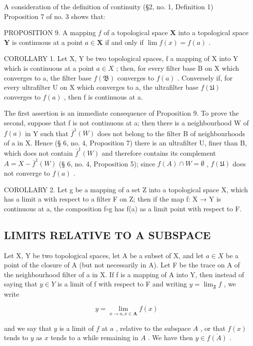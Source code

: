 A consideration of the definition of continuity (§2, no. 1, Definition 1) Proposition 7 of no. 3 shows that:

PROPOSITION 9. A mapping \(f\) of a topological space \(\mathbf{X}\) into a topological space \(\mathbf{Y}\) is continuous at a point \(a \in \mathbf{X}\) if and only if \(\lim f(x) = f(a)\) .

COROLLARY 1. Let X, Y be two topological spaces, f a mapping of X into Y which is continuous at a point \(a \in X\) ; then, for every filter base B on X which converges to a, the filter base \(f(\mathfrak{B})\) converges to \(f(a)\) . Conversely if, for every ultrafilter U on X which converges to a, the ultrafilter base \(f(\mathfrak{U})\) converges to \(f(a)\) , then f is continuous at a.

The first assertion is an immediate consequence of Proposition 9. To prove the second, suppose that f is not continuous at a; then there is a neighbourhood W of \(f(a)\) in Y such that \(\overline{f}^{1}(W)\) does not belong to the filter B of neighbourhoods of a in X. Hence (§ 6, no. 4, Proposition 7) there is an ultrafilter U, finer than B, which does not contain \(\overline{f}^{1}(W)\) and therefore contains its complement \(A = X - \overline{f}^{1}(W)\) (§ 6, no. 4, Proposition 5); since \(f(A) \cap W = \emptyset\) , \(f(\mathfrak{U})\) does not converge to \(f(a)\) .

COROLLARY 2. Let g be a mapping of a set Z into a topological space X, which has a limit a with respect to a filter F on Z; then if the map f: X → Y is continuous at a, the composition f\(\circ\)g has f(a) as a limit point with respect to F.

\subsection{LIMITS RELATIVE TO A SUBSPACE}

Let X, Y be two topological spaces, let A be a subset of X, and let \(a \in X\) be a point of the closure of A (but not necessarily in A). Let F be the trace on A of the neighbourhood filter of a in X. If f is a mapping of A into Y, then instead of saying that \(y \in Y\) is a limit of f with respect to F and writing \(y = \lim_{\mathfrak{F}} f\) , we write

\[
y = \lim _ {x \to a, x \in \mathbf {A}} f (x)
\]

and we say that \(y\) is a limit of \(f\) at \(a\) , relative to the subspace \(A\) , or that \(f(x)\) tends to \(y\) as \(x\) tends to a while remaining in \(A\) . We have then \(y \in \overline{f(A)}\) .

